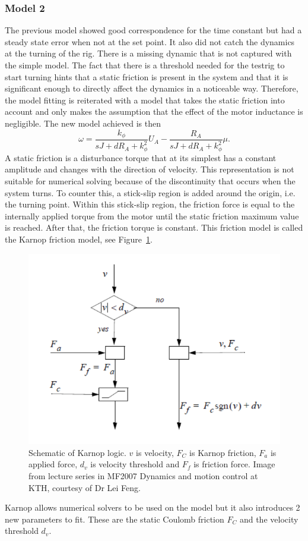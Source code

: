 \subsubsection{Model 2}
The previous model showed good correspondence for the time constant but had a
steady state error when not at the set point. It also did not catch the dynamics
at the turning of the rig. There is a missing dynamic that is not captured with
the simple model. The fact that there is a threshold needed for the testrig to
start turning hints that a static friction is present in the system and that it
is significant enough to directly affect the dynamics in a noticeable way.
Therefore, the model fitting is reiterated with a model that takes the static
friction into account and only makes the assumption that the effect of the motor
inductance is negligible. The new model achieved is then
\begin{equation} \label{eq:model2}
    \omega = \frac {k_{\phi}} {sJ + d R_A + k_{\phi}^2} U_A -
    \frac {R_A} {sJ + d R_A + k_{\phi}^2} \mu.
\end{equation}
A static friction is a disturbance torque that at its simplest has a constant
amplitude and changes with the direction of velocity. This representation is not
suitable for numerical solving because of the discontinuity that occurs when the
system turns. To counter this, a stick-slip region is added around the origin,
i.e. the turning point. Within this stick-slip region, the friction force is
equal to the internally applied torque from the motor until the static friction
maximum value is reached. After that, the friction torque is constant. This
friction model is called the Karnop friction model, see Figure~\ref{fig:karnop}.
\begin{figure}[H]
    \centering
    \includegraphics[width=\textwidth]{./img/testrig_karnoplogic.png}
    \caption{Schematic of Karnop logic. $v$ is velocity, $F_C$ is Karnop
    friction, $F_a$ is applied force, $d_v$ is velocity threshold and $F_f$ is
friction force. Image from lecture series in MF2007 Dynamics and motion control
at KTH, courtesy of Dr Lei Feng.}
    \label{fig:karnop}
\end{figure}
Karnop allows numerical solvers to be used on the model but it also introduces 2 new
parameters to fit. These are the static Coulomb friction $F_C$ and the velocity
threshold $d_v$.

